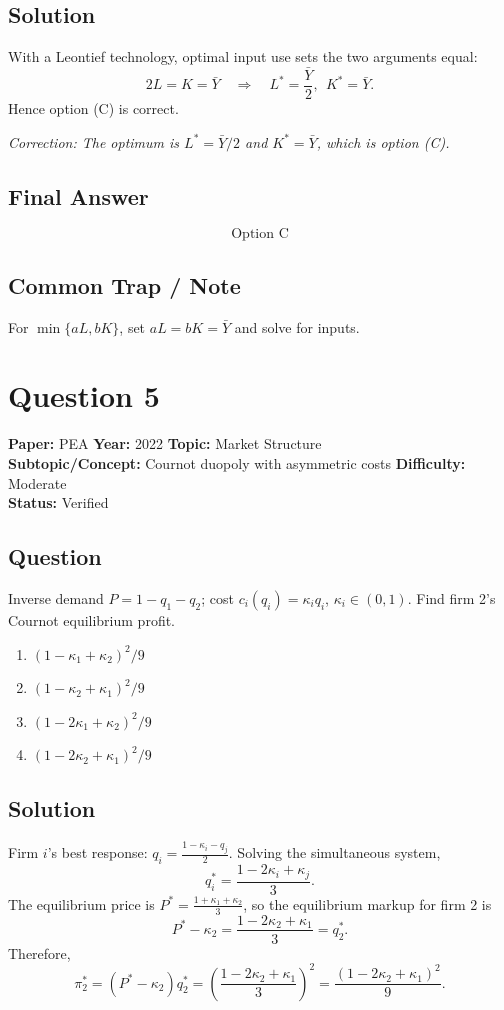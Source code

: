 \documentclass[11pt]{article}
\begin{document}
\subsection*{Solution}
With a Leontief technology, optimal input use sets the two arguments equal:
\[
2L = K = \bar Y \quad \Longrightarrow \quad L^* = \frac{\bar Y}{2},\ \ K^* = \bar Y.
\]
Hence option (C) is correct.

\textit{Correction: The optimum is $L^* = \bar Y/2$ and $K^* = \bar Y$, which is option (C).}

\subsection*{Final Answer}
\[
\boxed{\text{Option C}}
\]

\subsection*{Common Trap / Note}
For $\min\{aL, bK\}$, set $aL = bK = \bar Y$ and solve for inputs.

\section*{Question 5}
\textbf{Paper:} PEA \quad \textbf{Year:} 2022 \quad \textbf{Topic:} Market Structure \\
\textbf{Subtopic/Concept:} Cournot duopoly with asymmetric costs \quad \textbf{Difficulty:} Moderate \\
\textbf{Status:} Verified

\subsection*{Question}
Inverse demand $P = 1 - q_1 - q_2$; cost $c_i(q_i) = \kappa_i q_i$, $\kappa_i \in (0,1)$.
Find firm 2's Cournot equilibrium profit.
\begin{enumerate}[label=(\Alph*)]
\item $(1 - \kappa_1 + \kappa_2)^2 / 9$
\item $(1 - \kappa_2 + \kappa_1)^2 / 9$  
\item $(1 - 2\kappa_1 + \kappa_2)^2 / 9$
\item $(1 - 2\kappa_2 + \kappa_1)^2 / 9$
\end{enumerate}

\subsection*{Solution}
Firm $i$'s best response: $q_i = \tfrac{1 - \kappa_i - q_j}{2}$.
Solving the simultaneous system,
\[
q_i^* = \frac{1 - 2\kappa_i + \kappa_j}{3}.
\]
The equilibrium price is $P^* = \tfrac{1 + \kappa_1 + \kappa_2}{3}$, so the equilibrium markup for firm 2 is
\[
P^* - \kappa_2 = \frac{1 - 2\kappa_2 + \kappa_1}{3} = q_2^*.
\]
Therefore,
\[
\pi_2^* = (P^* - \kappa_2) q_2^* = \left(\frac{1 - 2\kappa_2 + \kappa_1}{3}\right)^2
= \frac{(1 - 2\kappa_2 + \kappa_1)^2}{9}.
\]
\end{document}
